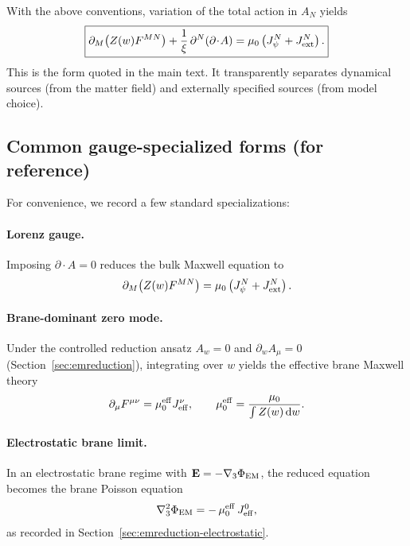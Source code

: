\documentclass[11pt]{article}
\begin{document}
With the above conventions, variation of the total action in $A_N$ yields
\begin{equation}
\boxed{
\partial_M\!\left(Z(w)F^{MN}\right)
+\frac{1}{\xi}\,\partial^N(\partial\!\cdot\!A)
=\mu_0\left(J_\psi^N+J_{\rm ext}^N\right).
}
\end{equation}
This is the form quoted in the main text. It transparently separates dynamical sources (from the matter field) and externally specified sources (from model choice).

\subsection{Common gauge-specialized forms (for reference)}
\label{app:gauge-special}

For convenience, we record a few standard specializations:

\paragraph{Lorenz gauge.}
Imposing $\partial\!\cdot\!A=0$ reduces the bulk Maxwell equation to
\begin{equation}
\partial_M\!\left(Z(w)F^{MN}\right)=\mu_0\left(J_\psi^N+J_{\rm ext}^N\right).
\end{equation}

\paragraph{Brane-dominant zero mode.}
Under the controlled reduction ansatz $A_w=0$ and $\partial_w A_\mu=0$ (Section~\ref{sec:emreduction}), integrating over $w$ yields the effective brane Maxwell theory
\begin{equation}
\partial_\mu F^{\mu\nu}=\mu_0^{\rm eff}J_{\rm eff}^\nu,
\qquad
\mu_0^{\rm eff}=\frac{\mu_0}{\int Z(w)\,\dd w}.
\end{equation}

\paragraph{Electrostatic brane limit.}
In an electrostatic brane regime with $\mathbf{E}=-\nabla_3\Phi_{\rm EM}$, the reduced equation becomes the brane Poisson equation
\begin{equation}
\nabla_3^2\Phi_{\rm EM} = -\,\mu_0^{\rm eff}\,J_{\rm eff}^0,
\end{equation}
as recorded in Section~\ref{sec:emreduction-electrostatic}.
\end{document}
